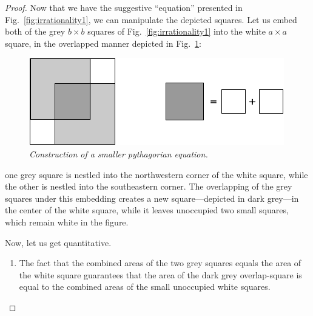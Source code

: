 \begin{proof}
Now that we have the suggestive ``equation'' presented in
Fig.~\ref{fig:irrationality1}, we can manipulate the depicted squares.
Let us embed both of the grey $b \times b$ squares of
Fig.~\ref{fig:irrationality1} into the white $a \times a$ square, in
the overlapped manner depicted in Fig.~\ref{fig:irrationality2}:
\begin{figure}[htb]
\begin{center}
       \includegraphics[scale=0.4]{FiguresArithmetic/sqrt2final}
\caption{{\it Construction of a smaller pythagorian equation.}
\label{fig:irrationality2}}
\end{center}
\end{figure}
one grey square is nestled into the northwestern corner of the white
square, while the other is nestled into the southeastern corner.
The overlapping of the grey squares under this
embedding creates a new square---depicted in dark grey---in the center
of the white square, while it leaves unoccupied two small squares,
which remain white in the figure.

Now, let us get quantitative.
\begin{enumerate}
\item
The fact that the combined areas of the two grey squares equals the
area of the white square guarantees that the area of the dark grey
overlap-square is equal to the combined areas of the small unoccupied
white squares.


\end{enumerate}
\end{proof}
